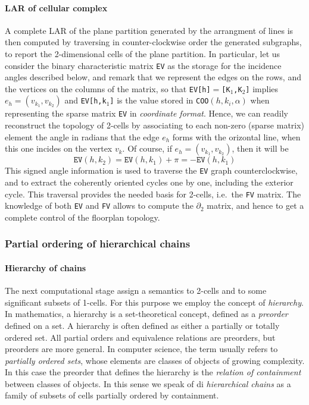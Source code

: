 \documentclass[]{egpubl}
\begin{document}
\paragraph*{LAR of cellular
complex}\label{reconstruction-of-lar-of-the-cellular-complex}

A complete LAR of the plane partition generated by the arrangment of
lines is then computed by traversing in
counter-clockwise order the generated subgraphs, to report the
2-dimensional cells of the plane partition.
In particular, let us consider the binary characteristic matrix \texttt{EV} as the storage for the incidence angles described below, and remark that we represent the edges on the
rows, and the vertices on the columns of the matrix, so that \texttt{EV[h]$=$[K$_1$,K$_2$]} implies $e_h = (v_{k_1},v_{k_2})$ 
and \texttt{EV[h,k$_1$]} is the value stored in 
\texttt{COO$(h,k_i,\alpha)$} when representing the sparse matrix \texttt{EV} in \emph{coordinate format}. 
Hence, we can readily reconstruct the topology of 2-cells by
associating to each non-zero (sparse matrix) element
the angle in radians that the edge $e_h$ forms
with the orizontal line, when this one incides on the vertex $v_k$.
Of course, if $e_h = (v_{k_1},v_{k_2})$, then it will be 
\[
\texttt{EV}(h,k_2) = \texttt{EV}(h,k_1)+\pi = -\texttt{EV}(h,k_1)
\]
This signed angle information is used to traverse the \texttt{EV} graph counterclockwise, and to extract the coherently oriented cycles one by one,
including the exterior cycle. This traversal provides the needed basis for 2-cells, i.e.~the \texttt{FV} matrix. The knowledge of both \texttt{EV} and \texttt{FV} allows to compute the $\partial_2$ matrix, and hence to get a complete control of the floorplan topology.

\subsubsection*{Partial ordering of hierarchical chains}

\paragraph*{Hierarchy of chains}

The next computational stage assign a semantics to 2-cells and to some significant subsets of 1-cells. For this purpose we employ the concept of \emph{hierarchy}.
In mathematics, a hierarchy is a set-theoretical concept, defined as a \emph{preorder} defined on a set. A hierarchy is often defined as either a partially or totally ordered set. All partial orders and equivalence relations are preorders, but preorders are more general. 
In computer science, the term usually refers to \emph{partially ordered sets}, whose elements are classes of objects of growing complexity. In this case the preorder that defines the hierarchy is the \emph{relation of containment} between classes of objects. In this sense we speak of  di \emph{hierarchical chains} as a family of subsets of cells partially ordered by containment.
\end{document}
